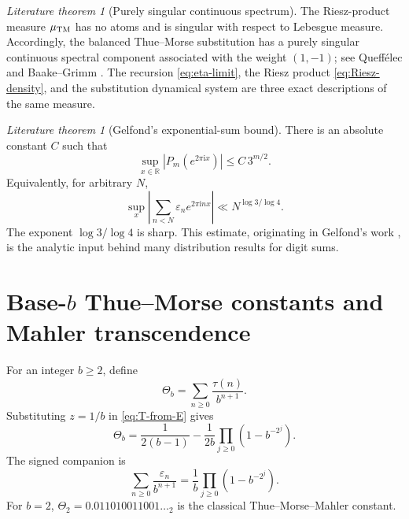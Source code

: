 \documentclass[11pt,oneside]{article}
\numberwithin{equation}{section}
\theoremstyle{definition}
\theoremstyle{remark}
\newtheorem{literature}[theorem]{Literature theorem}
\newcommand{\R}{\mathbb R}
\newcommand{\eps}{\varepsilon}
\newcommand{\TM}{\tau}
\newcommand{\ii}{\mathrm i}
\begin{document}
\begin{literature}[Purely singular continuous spectrum]
The Riesz-product measure \(\mu_{\rm TM}\) has no atoms and is singular with
respect to Lebesgue measure.  Accordingly, the balanced Thue--Morse
substitution has a purely singular continuous spectral component associated
with the weight \((1,-1)\); see Queff\'elec \cite{QueffelecSubstitution} and
Baake--Grimm \cite{BaakeGrimmTM}.  The recursion
\eqref{eq:eta-limit}, the Riesz product \eqref{eq:Riesz-density}, and the
substitution dynamical system are three exact descriptions of the same
measure.
\end{literature}

\begin{literature}[Gelfond's exponential-sum bound]
There is an absolute constant \(C\) such that
\begin{equation}
 \sup_{x\in\R}|P_m(e^{2\pi\ii x})|
 \le C\,3^{m/2}.
 \label{eq:Gelfond-bound}
\end{equation}
Equivalently, for arbitrary \(N\),
\begin{equation}
 \sup_x\left|\sum_{n<N}\eps_ne^{2\pi\ii nx}\right|
 \ll N^{\log3/\log4}.
 \label{eq:Gelfond-exponent}
\end{equation}
The exponent \(\log3/\log4\) is sharp.  This estimate, originating in
Gelfond's work \cite{Gelfond}, is the analytic input behind many distribution
results for digit sums.
\end{literature}

\section{Base-\texorpdfstring{\(b\)}{b} Thue--Morse constants and Mahler transcendence}
\label{sec:constants}

For an integer \(b\ge2\), define
\begin{equation}
 \Theta_b=\sum_{n\ge0}\frac{\TM(n)}{b^{n+1}}.
 \label{eq:Theta-b}
\end{equation}
Substituting \(z=1/b\) in \eqref{eq:T-from-E} gives
\begin{equation}
 \boxed{\Theta_b=
 \frac1{2(b-1)}-\frac1{2b}
 \prod_{j\ge0}(1-b^{-2^j}).}
 \label{eq:Theta-b-product}
\end{equation}
The signed companion is
\begin{equation}
 \sum_{n\ge0}\frac{\eps_n}{b^{n+1}}
 =\frac1b\prod_{j\ge0}(1-b^{-2^j}).
 \label{eq:signed-b-constant}
\end{equation}
For \(b=2\), \(\Theta_2=0.011010011001\ldots{}_2\) is the classical
Thue--Morse--Mahler constant.
\end{document}
